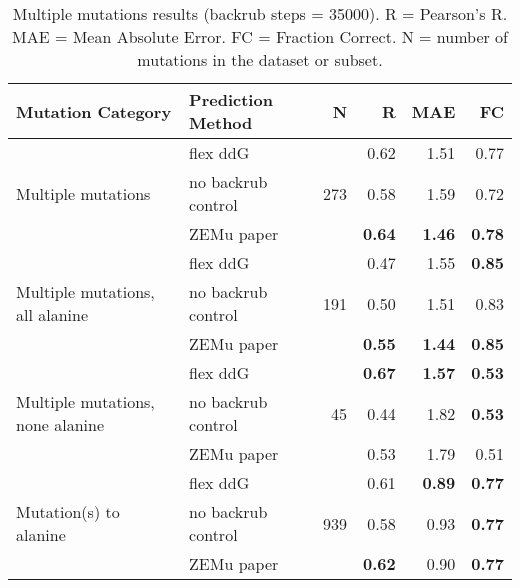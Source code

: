 \begin{table}
  \begin{tabular}{llrrrr}
\toprule
Mutation Category &   Prediction Method &    N &    R &  MAE &   FC \\
\midrule
 \multirow{ 3}{*}{Multiple mutations} & flex ddG & \multirow{ 3}{*}{273} & 0.62 & 1.51 & 0.77  \\
 & no backrub control & & 0.58 & 1.59 & 0.72  \\
 & ZEMu paper & & \textbf{0.64} & \textbf{1.46} & \textbf{0.78}  \\
\hline
 \multirow{ 3}{*}{Multiple mutations, all alanine} & flex ddG & \multirow{ 3}{*}{191} & 0.47 & 1.55 & \textbf{0.85}  \\
 & no backrub control & & 0.50 & 1.51 & 0.83  \\
 & ZEMu paper & & \textbf{0.55} & \textbf{1.44} & \textbf{0.85}  \\
\hline
 \multirow{ 3}{*}{Multiple mutations, none alanine} & flex ddG & \multirow{ 3}{*}{45} & \textbf{0.67} & \textbf{1.57} & \textbf{0.53}  \\
 & no backrub control & & 0.44 & 1.82 & \textbf{0.53}  \\
 & ZEMu paper & & 0.53 & 1.79 & 0.51  \\
\hline
 \multirow{ 3}{*}{Mutation(s) to alanine} & flex ddG & \multirow{ 3}{*}{939} & 0.61 & \textbf{0.89} & \textbf{0.77}  \\
 & no backrub control & & 0.58 & 0.93 & \textbf{0.77}  \\
 & ZEMu paper & & \textbf{0.62} & 0.90 & \textbf{0.77}  \\
\bottomrule
\end{tabular}
  \caption[Multiple mutations results]{
    Multiple mutations results (backrub steps = 35000). R = Pearson's R. MAE = Mean Absolute Error. FC = Fraction Correct. N = number of mutations in the dataset or subset.
  } \label{tab:table-mult}
\end{table}
